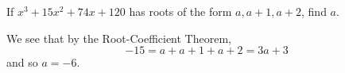 \documentclass[11pt,dvipsnames]{book}
\numberwithin{equation}{section} %
\numberwithin{figure}{section} %
\numberwithin{table}{section} %
\begin{document}
\begin{exercise}
\begin{itemize}
%
%
%
%
\end{itemize}
\end{exercise}



%
%



\begin{exercise} If $x^3+15x^2+74x+120$ has roots of the form $a,a+1,a+2$, find $a$.

\begin{solution}
We see that by the Root-Coefficient Theorem,
\[
-15=a+a+1+a+2=3a+3\]
and so $a=-6$.
\end{solution}

\end{exercise}
\end{document}
